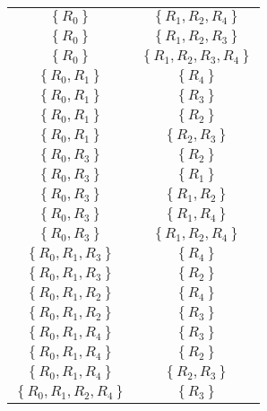 \documentclass[12pt]{scrartcl}
\begin{document}
\begin{enumerate}
\begin{table}[H]
\begin{center}
\begin{tabular}{cc}
				$\left\lbrace R_{0} \right\rbrace $	& $\left\lbrace R_{1}, R_{2}, R_{4} \right\rbrace $ \\	
				$\left\lbrace R_{0} \right\rbrace $	& $\left\lbrace R_{1}, R_{2}, R_{3} \right\rbrace $ \\	
				$\left\lbrace R_{0} \right\rbrace $	& $\left\lbrace R_{1}, R_{2}, R_{3}, R_{4} \right\rbrace $ \\	
				$\left\lbrace R_{0}, R_{1} \right\rbrace $	& $\left\lbrace R_{4}\right\rbrace $ \\	
				$\left\lbrace R_{0}, R_{1} \right\rbrace $	& $\left\lbrace R_{3}\right\rbrace $ \\
				$\left\lbrace R_{0}, R_{1} \right\rbrace $	& $\left\lbrace R_{2}\right\rbrace $ \\
				$\left\lbrace R_{0}, R_{1} \right\rbrace $	& $\left\lbrace R_{2}, R_{3}\right\rbrace $ \\
				$\left\lbrace R_{0}, R_{3} \right\rbrace $	& $\left\lbrace R_{2}\right\rbrace $ \\
				$\left\lbrace R_{0}, R_{3} \right\rbrace $	& $\left\lbrace R_{1}\right\rbrace $ \\
				$\left\lbrace R_{0}, R_{3} \right\rbrace $	& $\left\lbrace R_{1}, R_{2}\right\rbrace $ \\
				$\left\lbrace R_{0}, R_{3} \right\rbrace $	& $\left\lbrace R_{1}, R_{4}\right\rbrace $ \\
				$\left\lbrace R_{0}, R_{3} \right\rbrace $	& $\left\lbrace R_{1}, R_{2}, R_{4}\right\rbrace $ \\
				$\left\lbrace R_{0}, R_{1}, R_{3} \right\rbrace $	& $\left\lbrace R_{4}\right\rbrace $ \\
				$\left\lbrace R_{0}, R_{1}, R_{3} \right\rbrace $	& $\left\lbrace R_{2}\right\rbrace $ \\
				$\left\lbrace R_{0}, R_{1}, R_{2} \right\rbrace $	& $\left\lbrace R_{4}\right\rbrace $ \\
				$\left\lbrace R_{0}, R_{1}, R_{2} \right\rbrace $	& $\left\lbrace R_{3}\right\rbrace $ \\
				$\left\lbrace R_{0}, R_{1}, R_{4} \right\rbrace $	& $\left\lbrace R_{3}\right\rbrace $ \\
				$\left\lbrace R_{0}, R_{1}, R_{4} \right\rbrace $	& $\left\lbrace R_{2}\right\rbrace $ \\
				$\left\lbrace R_{0}, R_{1}, R_{4} \right\rbrace $	& $\left\lbrace R_{2}, R_{3}\right\rbrace $ \\
				$\left\lbrace R_{0}, R_{1}, R_{2}, R_{4} \right\rbrace $	& $\left\lbrace R_{3}\right\rbrace $ \\

\end{tabular}
\end{center}
\end{table}
\end{enumerate}
\end{document}
